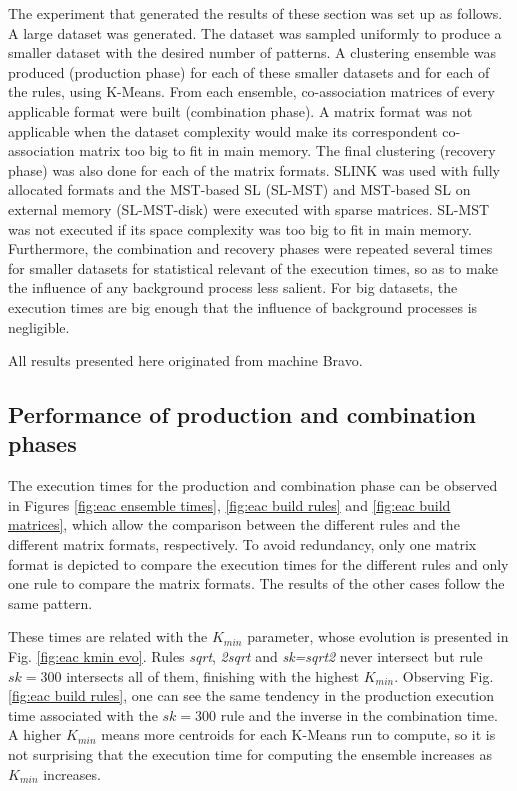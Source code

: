 The experiment that generated the results of these section was set up as follows.
A large dataset was generated.
The dataset was sampled uniformly to produce a smaller dataset with the desired number of patterns.
A clustering ensemble was produced (production phase) for each of these smaller datasets and for each of the rules, using K-Means.
From each ensemble, co-association matrices of every applicable format were built (combination phase).
A matrix format was not applicable when the dataset complexity would make its correspondent co-association matrix too big to fit in main memory.
The final clustering (recovery phase) was also done for each of the matrix formats.
SLINK was used with fully allocated formats and the MST-based SL (SL-MST) and MST-based SL on external memory (SL-MST-disk) were executed with sparse matrices.
SL-MST was not executed if its space complexity was too big to fit in main memory.
Furthermore, the combination and recovery phases were repeated several times for smaller datasets for statistical relevant of the execution times, so as to make the influence of any background process less salient.
For big datasets, the execution times are big enough that the influence of background processes is negligible.

All results presented here originated from machine Bravo.

\subsection{Performance of production and combination phases}

The execution times for the production and combination phase can be observed in Figures \ref{fig:eac ensemble times}, \ref{fig:eac build rules} and \ref{fig:eac build matrices}, which allow the comparison between the different rules and the different matrix formats, respectively.
To avoid redundancy, only one matrix format is depicted to compare the execution times for the different rules and only one rule to compare the matrix formats.
The results of the other cases follow the same pattern.

These times are related with the $K_{min}$ parameter, whose evolution is presented in Fig. \ref{fig:eac kmin evo}.
Rules \emph{sqrt}, \emph{2sqrt} and \emph{sk=sqrt2} never intersect but rule $sk=300$ intersects all of them, finishing with the highest $K_{min}$.
Observing Fig. \ref{fig:eac build rules}, one can see the same tendency in the production execution time associated with the $sk=300$ rule and the inverse in the combination time.
A higher $K_{min}$ means more centroids for each K-Means run to compute, so it is not surprising that the execution time for computing the ensemble increases as $K_{min}$ increases.

